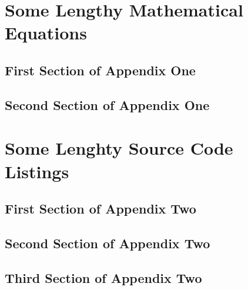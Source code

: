 \chapter{Some Lengthy Mathematical Equations}
\section{First Section of Appendix One}
\section{Second Section of Appendix One}

\chapter{Some Lenghty Source Code Listings}
\section{First Section of Appendix Two}
\section{Second Section of Appendix Two}
\section{Third Section of Appendix Two}